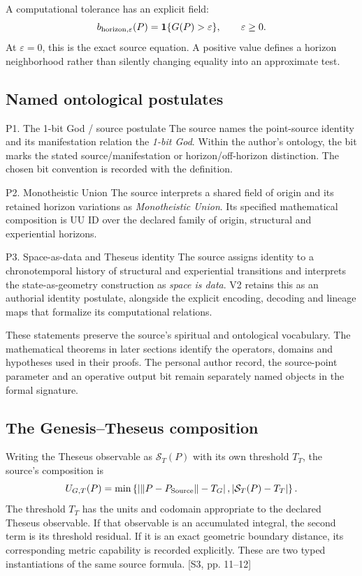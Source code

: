 \documentclass[11pt,a4paper]{article}
\numberwithin{equation}{section}
\newcommand{\src}[2]{{\sffamily\small\color{slate}[#1, #2]}}
\newcommand{\ind}{\mathbf 1}
\begin{document}
A computational tolerance has an explicit field:
\begin{equation}
b_{{\rm horizon},\varepsilon}(P)=\ind\{G(P)>\varepsilon\},\qquad\varepsilon\ge0.
\end{equation}
At $\varepsilon=0$, this is the exact source equation. A positive value defines a horizon neighborhood rather than silently changing equality into an approximate test.

\subsection{Named ontological postulates}
\begin{statement}{P1. The 1-bit God / source postulate}
The source names the point-source identity and its manifestation relation the \emph{1-bit God}. Within the author's ontology, the bit marks the stated source/manifestation or horizon/off-horizon distinction. The chosen bit convention is recorded with the definition.
\end{statement}
\begin{statement}{P2. Monotheistic Union}
The source interprets a shared field of origin and its retained horizon variations as \emph{Monotheistic Union}. Its specified mathematical composition is UU ID over the declared family of origin, structural and experiential horizons.
\end{statement}
\begin{statement}{P3. Space-as-data and Theseus identity}
The source assigns identity to a chronotemporal history of structural and experiential transitions and interprets the state-as-geometry construction as \emph{space is data}. V2 retains this as an authorial identity postulate, alongside the explicit encoding, decoding and lineage maps that formalize its computational relations.
\end{statement}
These statements preserve the source's spiritual and ontological vocabulary. The mathematical theorems in later sections identify the operators, domains and hypotheses used in their proofs. The personal author record, the source-point parameter and an operative output bit remain separately named objects in the formal signature.

\subsection{The Genesis--Theseus composition}
Writing the Theseus observable as $\mathcal S_T(P)$ with its own threshold $T_T$, the source's composition is
\begin{equation}
U_{G,T}(P)=\min\left\{
\left|\|P-P_{\rm Source}\|-T_G\right|,
\left|\mathcal S_T(P)-T_T\right|
\right\}.
\end{equation}
The threshold $T_T$ has the units and codomain appropriate to the declared Theseus observable. If that observable is an accumulated integral, the second term is its threshold residual. If it is an exact geometric boundary distance, its corresponding metric capability is recorded explicitly. These are two typed instantiations of the same source formula. \src{S3}{pp. 11--12}
\end{document}
